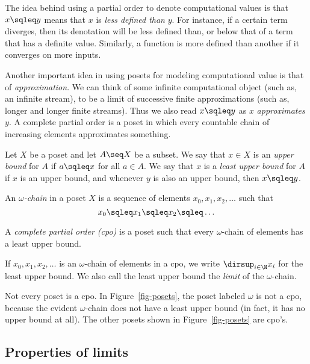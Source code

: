 \documentclass[12pt]{article}
\begin{document}
The idea behind using a partial order to denote computational values
is that $x\sqleq y$ means that $x$ is {\em less defined than} $y$. For
instance, if a certain term diverges, then its denotation will be less
defined than, or below that of a term that has a definite value.
Similarly, a function is more defined than another if it converges on
more inputs.

Another important idea in using posets for modeling computational
value is that of {\em approximation}. We can think of some infinite
computational object (such as, an infinite stream), to be a limit of
successive finite approximations (such as, longer and longer finite
streams). Thus we also read $x\sqleq y$ as $x$ {\em approximates} $y$.
A complete partial order is a poset in which every countable chain of
increasing elements approximates something.

\begin{definition}
  Let $X$ be a poset and let $A\seq X$ be a subset. We say that $x\in
  X$ is an {\em upper bound} for $A$ if $a\sqleq x$ for all $a\in A$.
  We say that $x$ is a {\em least upper bound} for $A$ if $x$ is an
  upper bound, and whenever $y$ is also an upper bound, then $x\sqleq
  y$.
\end{definition}

\begin{definition}
  An {\em $\omega$-chain} in a poset $X$ is a sequence of elements
  $x_0,x_1,x_2,\ldots$ such that
  \[ x_0 \sqleq x_1 \sqleq x_2 \sqleq \ldots \]
\end{definition}

\begin{definition}
  A {\em complete partial order (cpo)} is a poset such that every
  $\omega$-chain of elements has a least upper bound.
\end{definition}

If $x_0,x_1,x_2,\ldots$ is an $\omega$-chain of elements in a cpo, we
write $\dirsup_{i\in\N}x_i$ for the least upper bound. We also call
the least upper bound the {\em limit} of the $\omega$-chain.

Not every poset is a cpo. In Figure~\ref{fig-posets}, the poset
labeled $\omega$ is not a cpo, because the evident $\omega$-chain does
not have a least upper bound (in fact, it has no upper bound at all).
The other posets shown in Figure~\ref{fig-posets} are cpo's. 

\subsection{Properties of limits}
\end{document}
